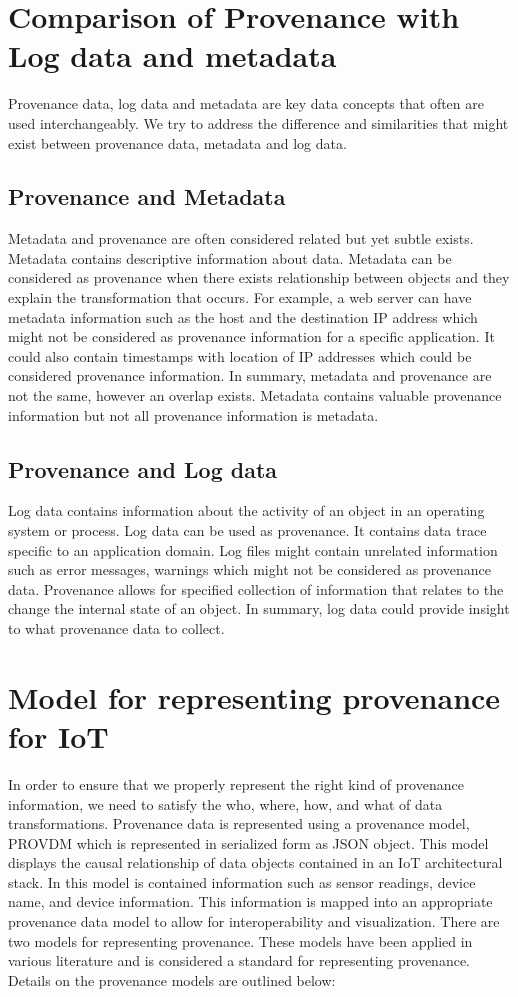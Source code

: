 \section{Comparison of Provenance with Log data and metadata}

Provenance data, log data and metadata are key data concepts that often are used interchangeably. We try to address the difference and similarities that might exist between provenance data, metadata and log data.

\subsection{Provenance and Metadata}
Metadata and provenance are often considered related but yet subtle exists. Metadata contains descriptive information about data. Metadata can be considered as provenance when there exists relationship between objects and they explain the transformation that occurs. For example, a web server can have metadata information such as the host and the destination IP address which might not be considered as provenance information for a specific application. It could also contain timestamps with location of IP addresses which could be considered provenance information. In summary,  metadata and provenance are not the same, however an overlap exists. Metadata contains valuable  provenance information but not all provenance information is metadata. 


\subsection{Provenance and Log data}
Log data contains information about the activity of an object in an operating system or process. Log data can be used as provenance. It contains data trace specific to an application domain. Log files might contain unrelated information such as error messages, warnings which might not be considered as provenance data. Provenance allows for specified collection of information that relates to the change the internal state of an object. In summary, log data could provide insight to what provenance data to collect. 

\section{Model for representing provenance for IoT}

In order to ensure that we properly represent the right kind of provenance information, we need to satisfy the who, where, how, and what of data transformations. Provenance data is represented using a provenance model, PROV\-DM which is represented in serialized form as JSON object. This model displays the causal relationship of data objects contained in an IoT architectural stack. In this model is contained information such as sensor readings, device name, and device information. This information is mapped into an appropriate provenance data model to allow for interoperability and visualization. There are two models for representing provenance. These models \cite{prov_dm} have been applied in various literature and is considered a standard for representing provenance. Details on the provenance models are outlined below:

